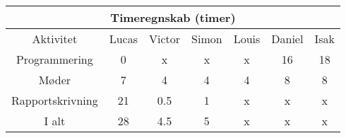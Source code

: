 \centering
\begin{tabular}{ |c|c|c|c|c|c|c|  }
 \hline
 \multicolumn{7}{|c|}{Timeregnskab (timer)} \\
 \hline
 Aktivitet & Lucas & Victor & Simon & Louis & Daniel & Isak\\
 \hline
 
 
 Programmering      & 0 & x & x & x & 16 & 18 \\
 
 Møder              & 7 & 4 & 4 & 4 & 8 & 8 \\
 
 Rapportskrivning   & 21 & 0.5 & 1 & x & x & x \\
 
 \hline
 
 I alt              & 28 & 4.5 & 5 & x & x & x \\
 
 
 \hline
\end{tabular}